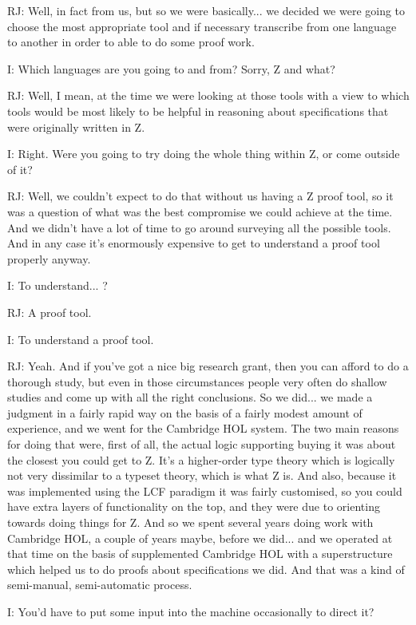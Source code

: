 \documentclass[10pt,titlepage]{book}
\begin{document}
RJ: Well, in fact from us, but so we were basically... we decided we were going to choose the most appropriate tool and if necessary transcribe from one language to another in order to able to do some proof work.

I: Which languages are you going to and from? Sorry, Z and what?

RJ: Well, I mean, at the time we were looking at those tools with a view to which tools would be most likely to be helpful in reasoning about specifications that were originally written in Z.

I: Right. Were you going to try doing the whole thing within Z, or come outside of it?

RJ: Well, we couldn't expect to do that without us having a Z proof tool, so it was a question of what was the best compromise we could achieve at the time. And we didn't have a lot of time to go around surveying all the possible tools. And in any case it's enormously expensive to get to understand a proof tool properly anyway.

I: To understand... ?

RJ: A proof tool.

I: To understand a proof tool.

RJ: Yeah. And if you've got a nice big research grant, then you can afford to do a thorough study, but even in those circumstances people very often do shallow studies and come up with all the right conclusions. So we did... we made a judgment in a fairly rapid way on the basis of a fairly modest amount of experience, and we went for the Cambridge HOL system. The two main reasons for doing that were, first of all, the actual logic supporting buying it was about the closest you could get to Z. It's a higher-order type theory which is logically not very dissimilar to a typeset theory, which is what Z is. And also, because it was implemented using the LCF paradigm it was fairly customised, so you could have extra layers of functionality on the top, and they were due to orienting towards doing things for Z. And so we spent several years doing work with Cambridge HOL, a couple of years maybe, before we did... and we operated at that time on the basis of supplemented Cambridge HOL with a superstructure which helped us to do proofs about specifications we did. And that was a kind of semi-manual, semi-automatic process.

I: You'd have to put some input into the machine occasionally to direct it?
\end{document}
